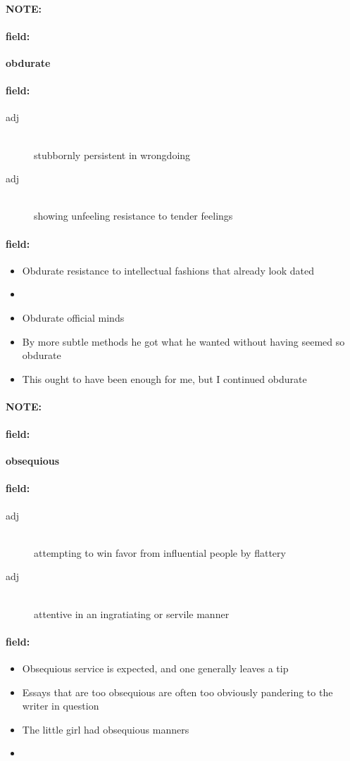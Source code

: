 \documentclass[12pt]{article}
\newenvironment{note}{\paragraph{NOTE:}}{}
\newenvironment{field}{\paragraph{field:}}{}
\begin{document}
\begin{note}
\begin{field}
\textbf{\large obdurate}
\end{field}


\begin{field}
\begin{description}
\item[adj] \hfill \\ 
stubbornly persistent in wrongdoing

\item[adj] \hfill \\ 
showing unfeeling resistance to tender feelings

\end{description}
\end{field}

\begin{field}
\begin{itemize}
\item Obdurate resistance to intellectual fashions that already look dated
\item 
\item Obdurate official minds
\item By more subtle methods he got what he wanted without having seemed so obdurate
\item This ought to have been enough for me, but I continued obdurate
\end{itemize}
\end{field}
\end{note}
\begin{note}
\begin{field}
\textbf{\large obsequious}
\end{field}


\begin{field}
\begin{description}
\item[adj] \hfill \\ 
attempting to win favor from influential people by flattery

\item[adj] \hfill \\ 
attentive in an ingratiating or servile manner

\end{description}
\end{field}

\begin{field}
\begin{itemize}
\item Obsequious service is expected, and one generally leaves a tip
\item Essays that are too obsequious are often too obviously pandering to the writer in question
\item The little girl had obsequious manners
\item 
\end{itemize}
\end{field}
\end{note}
\end{document}
